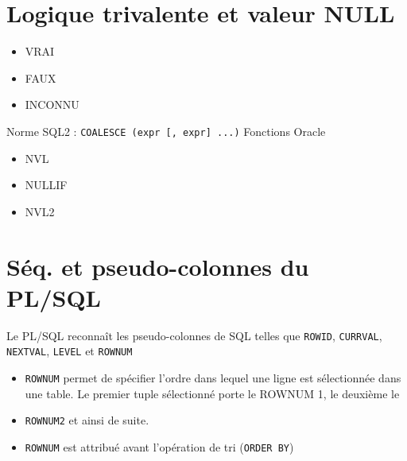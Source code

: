 \documentclass[10pt]{beamer}
\begin{document}
\section{Logique trivalente et valeur NULL}
\begin{frame}{\secname}
    \begin{itemize}
        \item VRAI
        \item FAUX
        \item INCONNU
    \end{itemize}
\end{frame}

\begin{frame}{\secname}
    Norme SQL2 : \lstinline[language=bnf]!COALESCE (expr [, expr] ...)!
    Fonctions Oracle
    \begin{itemize}
        \item NVL
        \item NULLIF
        \item NVL2
    \end{itemize}
\end{frame}
\section{Séq. et pseudo-colonnes du PL/SQL}
\begin{frame}{\secname}
    Le PL/SQL reconnaît les pseudo-colonnes de SQL telles que \lstinline[language=plsql]!ROWID!, \lstinline[language=plsql]!CURRVAL!, \lstinline[language=plsql]!NEXTVAL!, \lstinline[language=plsql]!LEVEL! et \lstinline[language=plsql]!ROWNUM!
    
\end{frame}

\begin{frame}{\secname}
    
\end{frame}

\begin{frame}{\secname}
    \begin{itemize}
        \item \lstinline[language=plsql]!ROWNUM! permet de spécifier l'ordre dans lequel une ligne est sélectionnée dans une table.  Le premier tuple sélectionné porte le ROWNUM 1, le deuxième le
        \item \lstinline[language=plsql]!ROWNUM2! et ainsi de suite.
        \item \lstinline[language=plsql]!ROWNUM! est attribué avant l'opération de tri (\lstinline[language=plsql]!ORDER BY!)
    \end{itemize}
\end{frame}

\begin{frame}{\secname}
    
\end{frame}

\begin{frame}{\secname}
    
\end{frame}
\end{document}
